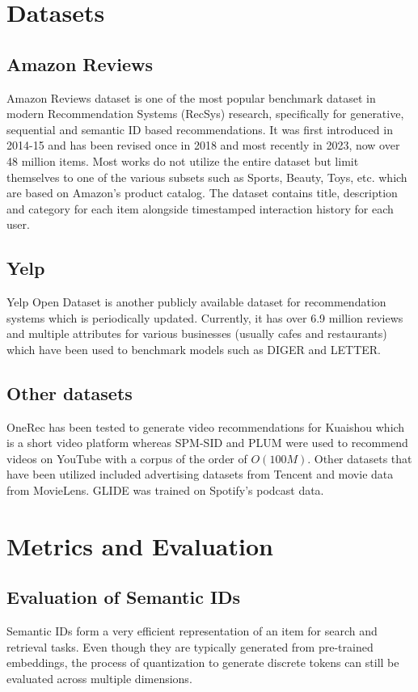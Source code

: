 \documentclass[11pt,a4paper]{article}
\begin{document}
\section{Datasets}
\subsection{Amazon Reviews}\label{subsection:AmazonReviews}
Amazon Reviews dataset is one of the most popular benchmark dataset in modern Recommendation Systems (RecSys) research, specifically for generative, sequential and semantic ID based recommendations. It was first introduced in 2014-15 \cite{amazonreview_mcauley2015imagebasedrecommendationsstylessubstitutes} and has been revised once in 2018 and most recently in 2023, now over 48 million items. Most works do not utilize the entire dataset but limit themselves to one of the various subsets such as Sports, Beauty, Toys, etc. which are based on Amazon's product catalog. The dataset contains title, description and category for each item alongside timestamped interaction history for each user.

\subsection{Yelp}
Yelp Open Dataset is another publicly available dataset for recommendation systems which is periodically updated. Currently, it has over 6.9 million reviews and multiple attributes for various businesses (usually cafes and restaurants) which have been used to benchmark models such as DIGER and LETTER.

\subsection{Other datasets}
OneRec has been tested to generate video recommendations for Kuaishou which is a short video platform whereas SPM-SID and PLUM were used to recommend videos on YouTube with a corpus of the order of $O(100M)$. Other datasets that have been utilized included advertising datasets from Tencent and movie data from MovieLens. GLIDE was trained on Spotify's podcast data.

\section{Metrics and Evaluation}

\subsection{Evaluation of Semantic IDs}
Semantic IDs form a very efficient representation of an item for search and retrieval tasks. Even though they are typically generated from pre-trained embeddings, the process of quantization to generate discrete tokens can still be evaluated across multiple dimensions.
\end{document}
